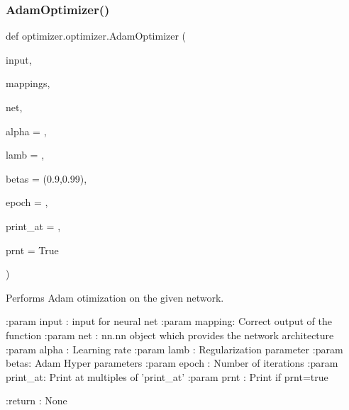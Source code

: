 \subsubsection{\texorpdfstring{Adam\+Optimizer()}{AdamOptimizer()}}
{\footnotesize\ttfamily def optimizer.\+optimizer.\+Adam\+Optimizer (\begin{DoxyParamCaption}\item[{}]{input,  }\item[{}]{mappings,  }\item[{}]{net,  }\item[{}]{alpha = {},  }\item[{}]{lamb = {},  }\item[{}]{betas = {\ttfamily (0.9,0.99)},  }\item[{}]{epoch = {},  }\item[{}]{print\+\_\+at = {},  }\item[{}]{prnt = {\ttfamily True} }\end{DoxyParamCaption})\hspace{0.3cm}{\ttfamily [static]}}

\begin{DoxyVerb}Performs Adam otimization on the given network.

:param input  : input for neural net
:param mapping: Correct output of the function
:param net    : nn.nn object which provides the network architecture
:param alpha  : Learning rate
:param lamb   : Regularization parameter
:param betas: Adam Hyper parameters
:param epoch  : Number of iterations
:param print_at: Print at multiples of 'print_at'
:param prnt   : Print if prnt=true

:return : None
\end{DoxyVerb}
 \mbox{\label{classoptimizer_1_1optimizer_a14925be33f066a482408567cf9ee440f}} 
